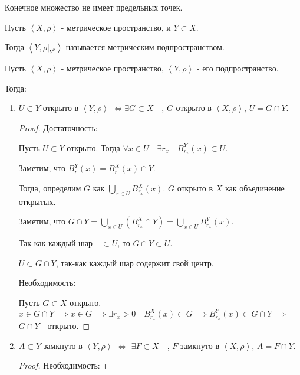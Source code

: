 \begin{consequence} \thmslashn

    Конечное множество не имеет предельных точек.
\end{consequence}
\begin{definition} \thmslashn 

    Пусть $\left<X, \rho\right>$ - метрическое пространство, и $Y \subset X$.

    Тогда $\left<Y, \left.\rho\right|_{Y^2}\right>$ называется метрическим подпространством.
\end{definition}
\begin{theorem} \thmslashn

   Пусть $\left<X, \rho\right>$ - метрическое пространство, $\left<Y, \rho\right>$ - его подпространство.

   Тогда: 
   \begin{enumerate}
       \item $U \subset Y$ открыто в $\left<Y, \rho\right>$ $\iff \exists{G \subset X}\quad $, $G$ открыто в $\left<X, \rho\right>$, $U = G\cap Y$.
           \begin{proof} \thmslashn
           
               Достаточность:

               Пусть $U \subset Y$ открыто. Тогда $\forall{x\in U}\quad \exists{r_{x}}\quad B_{r_{x}}^{Y}(x) \subset U$.

               Заметим, что $B_{r}^{Y}(x) = B_{r}^{X}(x)\cap Y$.

               Тогда, определим $G$ как $\bigcup\limits_{x\in U} B_{r_{x}}^{X}(x)$. $G$ открыто в $X$ как объединение открытых.

               Заметим, что $G\cap Y = \bigcup\limits_{x\in U} (B_{r_{x}}^{X}\cap Y) = \bigcup\limits_{x\in U} B_{r_{x}}^{Y}(x) $.

               Так-как каждый шар - $ \subset U$, то $G\cap Y \subset U$.

               $U \subset G\cap Y$, так-как каждый шар содержит свой центр.

               Необходимость:

               Пусть $G \subset X$ открыто. $x\in G\cap Y \implies x\in G \implies \exists{r_{x} > 0}\quad B_{r_{x}}^{X}(x) \subset G \implies B_{r_{x}}^{Y}(x) \subset G\cap Y \implies$ $G\cap Y$ - открыто.
           \end{proof}
        \item $A \subset Y$ замкнуто в $\left<Y, \rho\right>$ $\iff $ $\exists{F \subset X}\quad $, $F$ замкнуто в $\left<X, \rho\right>$, $A = F\cap Y$.
            \begin{proof}
                Необходимость:


\end{proof}
\end{enumerate}
\end{theorem}
